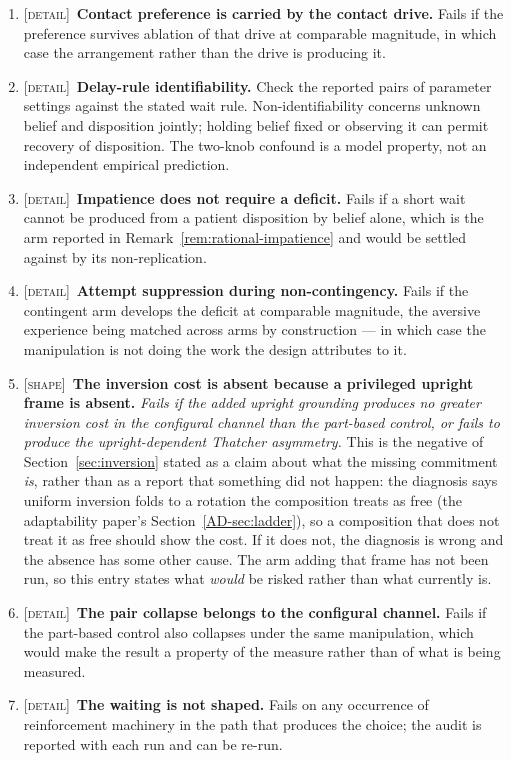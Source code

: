 \documentclass[11pt,a4paper]{article}
\theoremstyle{remark}
\begin{document}
\begin{enumerate}[leftmargin=*]
\item \textsc{[detail]}~\textbf{Contact preference is carried by the contact drive.} Fails if the
preference survives ablation of that drive at comparable magnitude, in which case the arrangement
rather than the drive is producing it.
\item \textsc{[detail]}~\textbf{Delay-rule identifiability.} Check the reported pairs of parameter
settings against the stated wait rule. Non-identifiability concerns unknown
belief and disposition jointly; holding belief fixed or observing it can permit
recovery of disposition. The two-knob confound is a model property, not an
independent empirical prediction.

\item \textsc{[detail]}~\textbf{Impatience does not require a deficit.} Fails if a short wait cannot
be produced from a patient disposition by belief alone, which is the arm reported in
Remark~\ref{rem:rational-impatience} and would be settled against by its non-replication.
\item \textsc{[detail]}~\textbf{Attempt suppression during non-contingency.} Fails
if the contingent arm develops the deficit at comparable magnitude, the aversive experience being
matched across arms by construction --- in which case the manipulation is not doing the work the
design attributes to it.
\item \textsc{[shape]}~\textbf{The inversion cost is absent because a privileged upright frame is
absent.} \emph{Fails if the added upright grounding produces no greater inversion cost in the configural channel than the part-based control, or fails to produce the upright-dependent Thatcher asymmetry.} This
is the negative of Section~\ref{sec:inversion} stated as a claim about what the missing commitment
\emph{is}, rather than as a report that something did not happen: the diagnosis says uniform inversion
folds to a rotation the composition treats as free (the adaptability paper's
Section~\ref{AD-sec:ladder}), so a composition that does not treat it as free should show the cost.
If it does not, the diagnosis is wrong and the absence has some other cause. The arm adding that
frame has not been run, so this entry states what \emph{would} be risked rather than what currently
is.
\item \textsc{[detail]}~\textbf{The pair collapse belongs to the configural channel.} Fails if the
part-based control also collapses under the same manipulation, which would make the result a property
of the measure rather than of what is being measured.
\item \textsc{[detail]}~\textbf{The waiting is not shaped.} Fails on any occurrence of reinforcement
machinery in the path that produces the choice; the audit is reported with each run and can be
re-run.
\end{enumerate}
\end{document}
